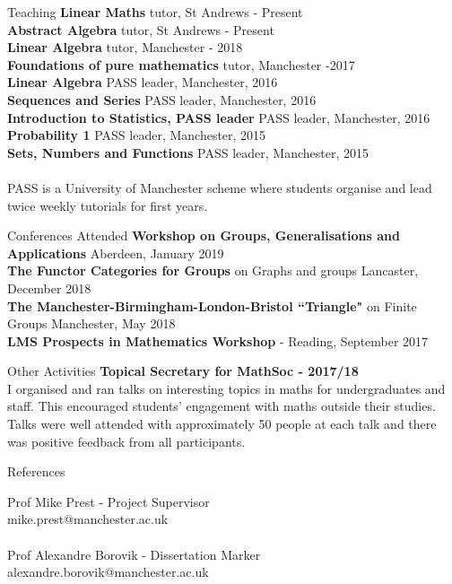 \documentclass{resume} %
\begin{document}
\vspace{0.3cm}
\begin{rSection}{Teaching }
\textbf{Linear Maths} tutor, St Andrews - Present\\
\textbf{Abstract Algebra} tutor, St Andrews - Present\\
\textbf{Linear Algebra} tutor, Manchester - 2018\\
\textbf{Foundations of pure mathematics} tutor, Manchester -2017\\
\textbf{Linear Algebra} PASS leader, Manchester, 2016\\
\textbf{Sequences and Series} PASS leader, Manchester, 2016\\ 
\textbf{Introduction to Statistics, PASS leader} PASS leader, Manchester, 2016\\
\textbf{Probability 1} PASS leader, Manchester, 2015\\
\textbf{Sets, Numbers and Functions} PASS leader, Manchester, 2015\\
\\
PASS is a University of Manchester scheme where students organise and lead twice weekly tutorials for first years.
\end{rSection}
\vspace{0.3cm}
\begin{rSection}{Conferences Attended}
\textbf{Workshop on Groups, Generalisations and Applications} Aberdeen, January 2019\\
\textbf{The Functor Categories for Groups} on Graphs and groups Lancaster, December 2018\\
\textbf{The Manchester-Birmingham-London-Bristol ``Triangle"} on Finite Groups Manchester, May 2018\\
\textbf{ LMS Prospects in Mathematics Workshop} - Reading, September 2017
\end{rSection}
\vspace{0.3cm}
\begin{rSection}{Other Activities}
\textbf{Topical Secretary for MathSoc - 2017/18}\\
I organised and ran talks on interesting topics in maths for undergraduates and staff. This encouraged students' engagement with maths outside their studies. Talks were well attended with approximately 50 people at each talk and there was positive feedback from all participants. 
\end{rSection}
\vspace{0.3cm}
\begin{rSection}{References}
\begin{multicols}{2}
Prof Mike Prest - Project Supervisor\\ mike.prest@manchester.ac.uk\\
\\
Prof Alexandre Borovik - Dissertation Marker \\ 
alexandre.borovik@manchester.ac.uk
\end{multicols}
\end{rSection}




\end{document}
